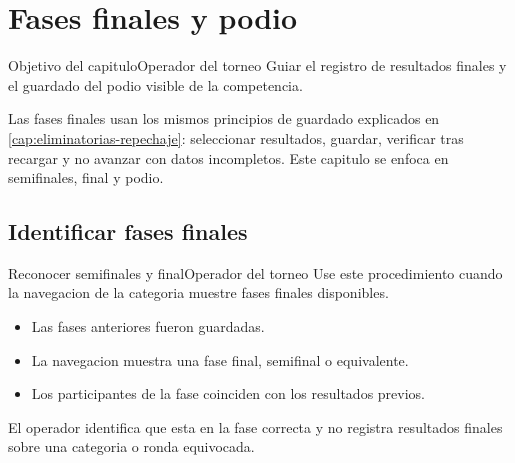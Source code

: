 \chapter{Fases finales y podio}
\label{cap:fases-finales-podio}

\begin{procedimiento}{Objetivo del capitulo}{Operador del torneo}
Guiar el registro de resultados finales y el guardado del podio visible de la competencia.
\end{procedimiento}

Las fases finales usan los mismos principios de guardado explicados en \cref{cap:eliminatorias-repechaje}: seleccionar resultados, guardar, verificar tras recargar y no avanzar con datos incompletos. Este capitulo se enfoca en semifinales, final y podio.

\section{Identificar fases finales}

\begin{procedimiento}{Reconocer semifinales y final}{Operador del torneo}
Use este procedimiento cuando la navegacion de la categoria muestre fases finales disponibles.
\end{procedimiento}

\begin{precondiciones}
\begin{itemize}
    \item Las fases anteriores fueron guardadas.
    \item La navegacion muestra una fase final, semifinal o equivalente.
    \item Los participantes de la fase coinciden con los resultados previos.
\end{itemize}
\end{precondiciones}


\begin{resultadoesperado}
El operador identifica que esta en la fase correcta y no registra resultados finales sobre una categoria o ronda equivocada.
\end{resultadoesperado}

